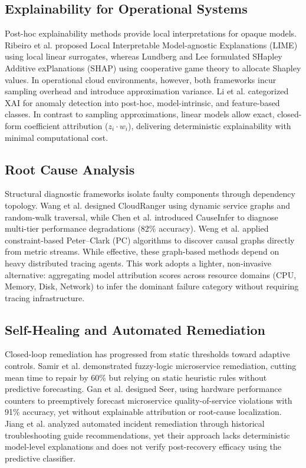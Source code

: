 \documentclass[conference]{IEEEtran}
\begin{document}
\subsection{Explainability for Operational Systems}

Post-hoc explainability methods provide local interpretations for opaque models. Ribeiro et al. \cite{Ribeiro2016LIME} proposed Local Interpretable Model-agnostic Explanations (LIME) using local linear surrogates, whereas Lundberg and Lee \cite{Lundberg2017SHAP} formulated SHapley Additive exPlanations (SHAP) using cooperative game theory to allocate Shapley values. In operational cloud environments, however, both frameworks incur sampling overhead and introduce approximation variance. Li et al. \cite{Li2023XAISurvey} categorized XAI for anomaly detection into post-hoc, model-intrinsic, and feature-based classes. In contrast to sampling approximations, linear models allow exact, closed-form coefficient attribution ($z_i \cdot w_i$), delivering deterministic explainability with minimal computational cost.

\subsection{Root Cause Analysis}

Structural diagnostic frameworks isolate faulty components through dependency topology. Wang et al. \cite{Wang2018CloudRanger} designed CloudRanger using dynamic service graphs and random-walk traversal, while Chen et al. \cite{Chen2014CauseInfer} introduced CauseInfer to diagnose multi-tier performance degradations (82\% accuracy). Weng et al. \cite{Weng2018RCA} applied constraint-based Peter--Clark (PC) algorithms to discover causal graphs directly from metric streams. While effective, these graph-based methods depend on heavy distributed tracing agents. This work adopts a lighter, non-invasive alternative: aggregating model attribution scores across resource domains (CPU, Memory, Disk, Network) to infer the dominant failure category without requiring tracing infrastructure.

\subsection{Self-Healing and Automated Remediation}

Closed-loop remediation has progressed from static thresholds toward adaptive controls. Samir et al. \cite{Samir2019SelfHealing} demonstrated fuzzy-logic microservice remediation, cutting mean time to repair by 60\% but relying on static heuristic rules without predictive forecasting. Gan et al. \cite{Gan2019Seer} designed Seer, using hardware performance counters to preemptively forecast microservice quality-of-service violations with 91\% accuracy, yet without explainable attribution or root-cause localization. Jiang et al. \cite{Jiang2020Mitigation} analyzed automated incident remediation through historical troubleshooting guide recommendations, yet their approach lacks deterministic model-level explanations and does not verify post-recovery efficacy using the predictive classifier.
\end{document}
